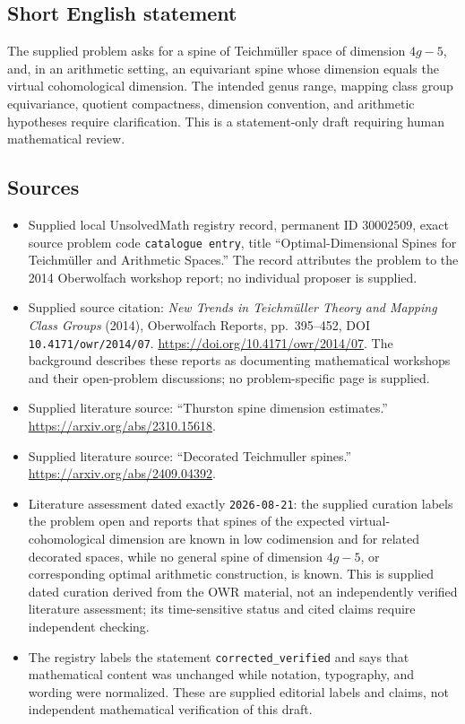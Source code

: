 \documentclass[11pt]{article}
\begin{document}
\subsection{Short English statement}
The supplied problem asks for a spine of Teichm\"uller space of dimension \(4g-5\), and, in an arithmetic setting, an equivariant spine whose dimension equals the virtual cohomological dimension. The intended genus range, mapping class group equivariance, quotient compactness, dimension convention, and arithmetic hypotheses require clarification. This is a statement-only draft requiring human mathematical review.
\subsection{Sources}
\begin{itemize}
\item Supplied local UnsolvedMath registry record, permanent ID \(30002509\), exact source problem code \texttt{catalogue entry}, title ``Optimal-Dimensional Spines for Teichm\"uller and Arithmetic Spaces.'' The record attributes the problem to the 2014 Oberwolfach workshop report; no individual proposer is supplied.
\item Supplied source citation: \emph{New Trends in Teichm\"uller Theory and Mapping Class Groups} (2014), Oberwolfach Reports, pp.~395--452, DOI \texttt{10.4171/owr/2014/07}. \url{https://doi.org/10.4171/owr/2014/07}. The background describes these reports as documenting mathematical workshops and their open-problem discussions; no problem-specific page is supplied.
\item Supplied literature source: ``Thurston spine dimension estimates.'' \url{https://arxiv.org/abs/2310.15618}.
\item Supplied literature source: ``Decorated Teichmuller spines.'' \url{https://arxiv.org/abs/2409.04392}.
\item Literature assessment dated exactly \texttt{2026-08-21}: the supplied curation labels the problem open and reports that spines of the expected virtual-cohomological dimension are known in low codimension and for related decorated spaces, while no general spine of dimension \(4g-5\), or corresponding optimal arithmetic construction, is known. This is supplied dated curation derived from the OWR material, not an independently verified literature assessment; its time-sensitive status and cited claims require independent checking.
\item The registry labels the statement \texttt{corrected\_verified} and says that mathematical content was unchanged while notation, typography, and wording were normalized. These are supplied editorial labels and claims, not independent mathematical verification of this draft.
\end{itemize}
\end{document}
